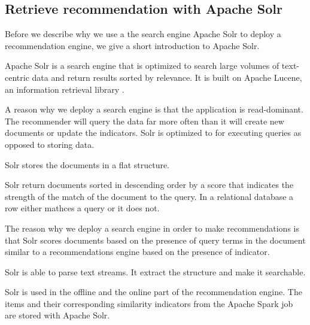 \subsection{Retrieve recommendation with Apache Solr}
\label{sec:solr}

Before we describe why we use a the search engine Apache Solr to deploy a recommendation engine, we give a short introduction to Apache Solr.

Apache Solr is a search engine that is optimized to search large volumes of text-centric data and return results sorted by relevance. It is built on Apache Lucene, an information retrieval library \cite{grainger}.

A reason why we deploy a search engine is that the application is read-dominant. The recommender will query the data far more often than it will create new documents or update the indicators. Solr is optimized to for executing queries as opposed to storing data.

Solr stores the documents in a flat structure.

Solr return documents sorted in descending order by a score that indicates the strength of the match of the document to the query. In a relational database a row either mathces a query or it does not.

The reason why we deploy a search engine in order to make recommendations is that Solr scores documents based on the presence of query terms in the document similar to a recommendations engine based on the presence of indicator.

Solr is able to parse text streams. It extract the structure and make it searchable.

Solr is used in the offline and the online part of the recommendation engine.
The items and their corresponding similarity indicators from the Apache Spark job are stored with Apache Solr. 

